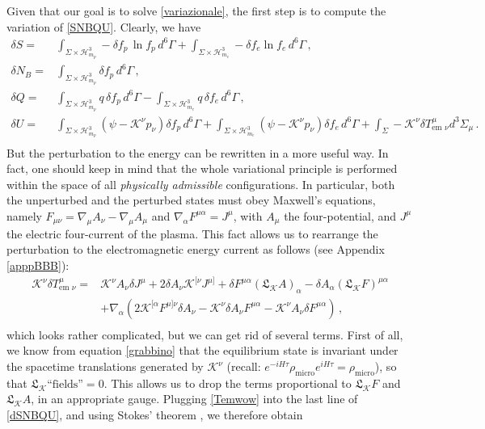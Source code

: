 \documentclass[a4paper, amsfonts, amssymb, amsmath, reprint, showkeys, nofootinbib, twoside, onecolumn,notitlepage]{revtex4-1}
\newcommand{\K}{{\mathcal{K}}}
\theoremstyle{definition}
\theoremstyle{theorem}
\begin{document}
Given that our goal is to solve \eqref{variazionale}, the first step is to compute the variation of \eqref{SNBQU}. Clearly, we have
\begin{equation}\label{dSNBQU}
\begin{split}
\delta S ={}& \int_{\Sigma \times \mathcal{H}^3_{m_p}} {-} \delta f_p \, \ln f_p \, d^6\Gamma +\int_{\Sigma \times \mathcal{H}^3_{m_e}} {-}\delta f_e \ln f_e \, d^6\Gamma \, , \\
\delta N_B ={}& \int_{\Sigma \times \mathcal{H}^3_{m_p}} \delta f_p \, d^6 \Gamma \, , \\
\delta Q ={}& \int_{\Sigma \times \mathcal{H}^3_{m_p}} q\, \delta f_p\, d^6\Gamma -\int_{\Sigma \times \mathcal{H}^3_{m_e}} q\, \delta f_e\, d^6\Gamma \, , \\
\delta U ={}& \int_{\Sigma \times \mathcal{H}^3_{m_p}} (\psi-\K^\nu p_\nu) \delta f_p\, d^6\Gamma +\int_{\Sigma \times \mathcal{H}^3_{m_e}} (\psi-\K^\nu p_\nu)\delta  f_e\, d^6\Gamma +\int_\Sigma -\K^\nu \delta  T^\mu_{\text{em }\nu} d^3\Sigma_\mu \, . \\
\end{split}
\end{equation}
But the perturbation to the energy can be rewritten in a more useful way. In fact, one should keep in mind that the whole variational principle is performed within the space of all \textit{physically admissible} configurations. In particular, both the unperturbed and the perturbed states must obey Maxwell's equations, namely $F_{\mu \nu}=\nabla_\mu A_\nu{-}\nabla_\mu A_\mu$ and $\nabla_\alpha F^{\mu \alpha}=J^\mu$, with $A_\mu$ the four-potential, and $J^\mu$ the electric four-current of the plasma. This fact allows us to rearrange the perturbation to the electromagnetic energy current as follows (see Appendix \ref{apppBBB}):
\newpage
\begin{equation}\label{Temwow}
\begin{split}
\K^\nu \delta T^{\mu }_{\text{em }\nu}={}&  \K^{\nu} A_\nu \delta J^\mu  +2\delta A_\nu \K^{ [\nu}J^{\mu]}+ \delta F^{\mu \alpha} (\mathfrak{L}_{\K} A)_\alpha-\delta A_\alpha (\mathfrak{L}_{\K} F)^{\mu \alpha} \\
&+ \nabla_\alpha(2\K^{[\alpha} F^{\mu] \nu}  \delta A_\nu-\K^{\nu}  \delta A_\nu F^{\mu \alpha}-\K^{\nu} A_\nu \delta F^{\mu \alpha}) \, ,  \\
\end{split}  
\end{equation}
which looks rather complicated, but we can get rid of several terms. First of all, we know from equation \eqref{grabbino} that the equilibrium state is invariant under the spacetime translations generated by $\K^\nu$ (recall: $e^{-iH\tau}\rho_\text{micro}e^{iH\tau}=\rho_\text{micro}$), so that $ \mathfrak{L}_\K \text{``fields''}=0$. This allows us to drop the terms proportional to $\mathfrak{L}_{\K} F$ and $\mathfrak{L}_{\K} A$, in an appropriate gauge. Plugging \eqref{Temwow} into the last line of \eqref{dSNBQU}, and using Stokes' theorem \cite[\S 3.3.3]{PoissonToolkit2009pwt}, we therefore obtain
\end{document}
